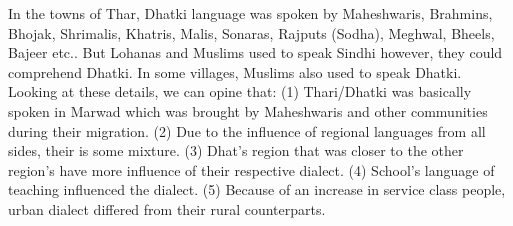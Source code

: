 In the towns of Thar, Dhatki language was spoken by Maheshwaris, Brahmins,
Bhojak, Shrimalis, Khatris, Malis, Sonaras, Rajputs (Sodha), Meghwal, Bheels,
Bajeer etc.. But Lohanas and Muslims used to speak Sindhi however, they could
comprehend Dhatki. In some villages, Muslims also used to speak Dhatki. Looking
at these details, we can opine that: (1) Thari/Dhatki was basically spoken in
Marwad which was brought by Maheshwaris and other communities during their
migration. (2) Due to the influence of regional languages from all sides, their
is some mixture. (3) Dhat's region that was closer to the other region's have
more influence of their respective dialect. (4) School's language of teaching
influenced the dialect. (5) Because of an increase in service class people,
urban dialect differed from their rural counterparts.

